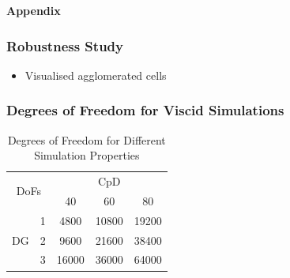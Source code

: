 \begin{frame}
	\begin{center}
		\Huge
		\textbf{Appendix}
	\end{center}
\end{frame}
\begin{frame}
	\frametitle{Robustness Study}
	\begin{figure}
		\vspace{-0.5cm}
		\centering
	\end{figure}
	\begin{itemize}
		\item Visualised agglomerated cells
	\end{itemize}
\end{frame}	
\begin{frame}
	\frametitle{Degrees of Freedom for Viscid Simulations}
	\begin{table}[htp]
		\centering
		\def\arraystretch{1.5}
		\begin{tabular}{|c|c|c|c|c|}
			\hline
			\multicolumn{2}{|c|}{\multirow{2}{*}{DoFs}} & \multicolumn{3}{c|}{CpD} \\ \cline{3-5} 
			\multicolumn{2}{|c|}{}                       & 40     & 60    & 80    \\ \hline
			\multirow{3}{*}{DG}            & 1           &    4800    &    10800   &    19200    \\ \cline{2-5} 
			& 2           &    9600    &   21600    &    38400    \\ \cline{2-5} 
			& 3           &      16000  &   36000    &   64000     \\ \hline
		\end{tabular}
		\caption{Degrees of Freedom for Different Simulation Properties}	
		\label{DOF}
	\end{table}
\end{frame}	
